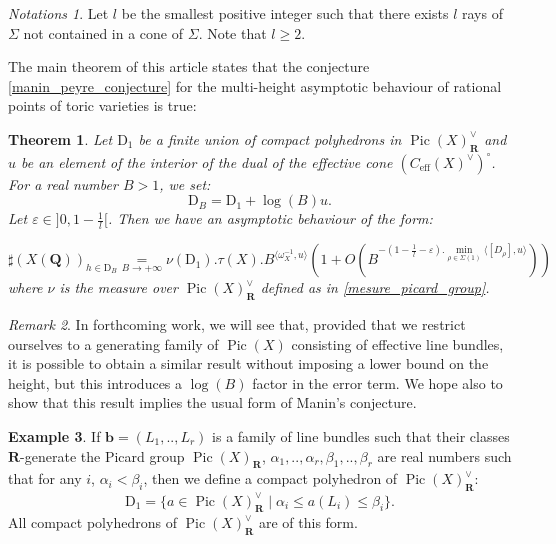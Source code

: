 \documentclass{proc-l}
\newcommand{\R}{\mathbf{R}}
\newcommand{\Q}{\mathbf{Q}}
\DeclareMathOperator{\Pic}{Pic}
\DeclareMathOperator{\eff}{eff}
\newcommand{\w}{\omega}
\newtheorem{theorem}{Theorem}[section]
\theoremstyle{definition}
\newtheorem{example}[theorem]{Example}
\theoremstyle{remark}
\newtheorem{remark}[theorem]{Remark}
\newtheorem*{Notations}{Notations}
\numberwithin{equation}{section}
\begin{document}
\begin{Notations}
    Let $l$ be the smallest positive integer such that there exists $l$ rays of $\Sigma$ not contained in a cone of $\Sigma$. Note that $l \geqslant 2$.
\end{Notations}

The main theorem of this article states that the conjecture \ref{manin_peyre_conjecture} for the multi-height asymptotic behaviour of rational points of toric varieties is true:

\begin{theorem}\label{theorem_principal_multi_hauteur}
Let $\mathrm{D}_1$ be a finite union of compact polyhedrons in $\Pic(X)^{\vee}_{\R}$ and $u$ be an element of the interior of the dual of the effective cone $(C_{\eff}(X)^{\vee})^{\circ}$. For a real number $B > 1$, we set:
$$ \mathrm{D}_B = \mathrm{D}_1 + \log(B) u .$$Let $\varepsilon \in ]0,1-\frac{1}{l}[$. Then we have an asymptotic behaviour of the form:

$$ \sharp ( X(\Q) )_{h \in \mathrm{D}_B} \underset{B \rightarrow +\infty}{=} \nu(\mathrm{D}_1 ) . \tau(X) .  B^{\langle \w_X^{-1},u \rangle} \left( 1 + O\left(B^{-(1-\frac{1}{l} - \varepsilon).\min\limits_{\rho \in \Sigma(1)} \langle [D_{\rho}] , u \rangle} \right) \right) $$ where $\nu$ is the measure over $\Pic(X)^{\vee}_{\R}$ defined as in \ref{mesure_picard_group}.

\end{theorem}

\begin{remark}
In forthcoming work, we will see that, provided that we restrict ourselves to a generating family of 
$\Pic(X)$ consisting of effective line bundles, it is possible to obtain a similar result without imposing a lower bound on the height, but this introduces a $\log(B)$ factor in the error term. We hope also to show that this result implies the usual form of Manin's conjecture.
\end{remark}


\begin{example}\label{exemple_compact_polyhèdre}
    If $ \mathbf{b} = (L_1,..,L_r)$ is a family of line bundles such that their classes $\R$-generate the Picard group $\Pic(X)_{\R}$, $\alpha_1,..,\alpha_r,\beta_1,..,\beta_r$  are real numbers such that for any $i$, $\alpha_i < \beta_i$, then we define a compact polyhedron of $\Pic(X)^{\vee}_{\R}$: $$\mathrm{D}_1 = \{ a \in \Pic(X)^{\vee}_{\R} \mid \alpha_i \leqslant a(L_i) \leqslant\beta_i \} .$$All compact polyhedrons of $\Pic(X)^{\vee}_{\R}$ are of this form.
\end{example}
\end{document}
